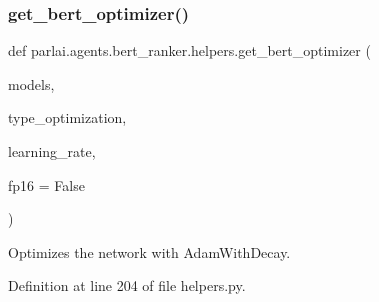 \mbox{\label{namespaceparlai_1_1agents_1_1bert__ranker_1_1helpers_a7a144c1f6c9af7925e754b9b61c0e6fb}} 
\subsubsection{\texorpdfstring{get\+\_\+bert\+\_\+optimizer()}{get\_bert\_optimizer()}}
{\footnotesize\ttfamily def parlai.\+agents.\+bert\+\_\+ranker.\+helpers.\+get\+\_\+bert\+\_\+optimizer (\begin{DoxyParamCaption}\item[{}]{models,  }\item[{}]{type\+\_\+optimization,  }\item[{}]{learning\+\_\+rate,  }\item[{}]{fp16 = {\ttfamily False} }\end{DoxyParamCaption})}

\begin{DoxyVerb}Optimizes the network with AdamWithDecay.
\end{DoxyVerb}
 

Definition at line 204 of file helpers.\+py.


